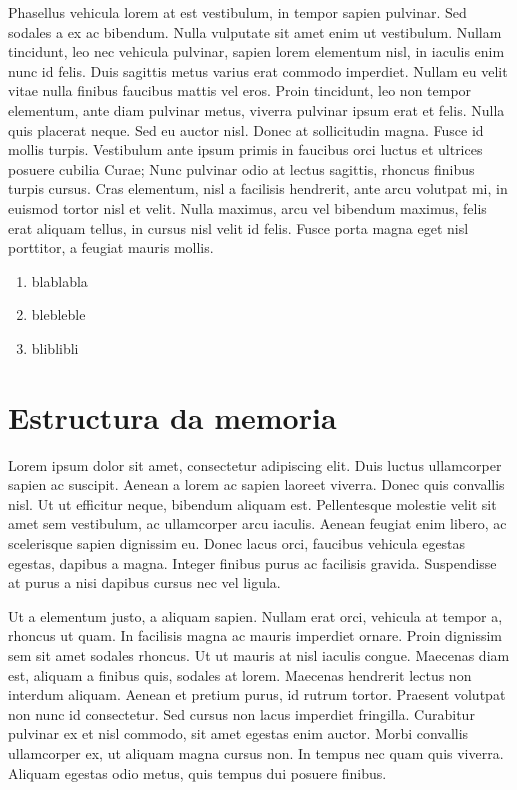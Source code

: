 \documentclass{pfc}
\begin{document}
Phasellus vehicula lorem at est vestibulum, in tempor sapien
pulvinar. Sed sodales a ex ac bibendum. Nulla vulputate sit amet enim
ut vestibulum. Nullam tincidunt, leo nec vehicula pulvinar, sapien
lorem elementum nisl, in iaculis enim nunc id felis. Duis sagittis
metus varius erat commodo imperdiet. Nullam eu velit vitae nulla
finibus faucibus mattis vel eros. Proin tincidunt, leo non tempor
elementum, ante diam pulvinar metus, viverra pulvinar ipsum erat et
felis. Nulla quis placerat neque. Sed eu auctor nisl. Donec at
sollicitudin magna. Fusce id mollis turpis. Vestibulum ante ipsum
primis in faucibus orci luctus et ultrices posuere cubilia Curae; Nunc
pulvinar odio at lectus sagittis, rhoncus finibus turpis cursus. Cras
elementum, nisl a facilisis hendrerit, ante arcu volutpat mi, in
euismod tortor nisl et velit. Nulla maximus, arcu vel bibendum
maximus, felis erat aliquam tellus, in cursus nisl velit id
felis. Fusce porta magna eget nisl porttitor, a feugiat mauris mollis.
\begin{enumerate}

\item blablabla

\item blebleble

\item bliblibli

\end{enumerate}


\section{Estructura da memoria}

Lorem ipsum dolor sit amet, consectetur adipiscing elit. Duis luctus
ullamcorper sapien ac suscipit. Aenean a lorem ac sapien laoreet
viverra. Donec quis convallis nisl. Ut ut efficitur neque, bibendum
aliquam est. Pellentesque molestie velit sit amet sem vestibulum, ac
ullamcorper arcu iaculis. Aenean feugiat enim libero, ac scelerisque
sapien dignissim eu. Donec lacus orci, faucibus vehicula egestas
egestas, dapibus a magna. Integer finibus purus ac facilisis
gravida. Suspendisse at purus a nisi dapibus cursus nec vel ligula.

Ut a elementum justo, a aliquam sapien. Nullam erat orci, vehicula at
tempor a, rhoncus ut quam. In facilisis magna ac mauris imperdiet
ornare. Proin dignissim sem sit amet sodales rhoncus. Ut ut mauris at
nisl iaculis congue. Maecenas diam est, aliquam a finibus quis,
sodales at lorem. Maecenas hendrerit lectus non interdum
aliquam. Aenean et pretium purus, id rutrum tortor. Praesent volutpat
non nunc id consectetur. Sed cursus non lacus imperdiet
fringilla. Curabitur pulvinar ex et nisl commodo, sit amet egestas
enim auctor. Morbi convallis ullamcorper ex, ut aliquam magna cursus
non. In tempus nec quam quis viverra. Aliquam egestas odio metus, quis
tempus dui posuere finibus.
\end{document}
